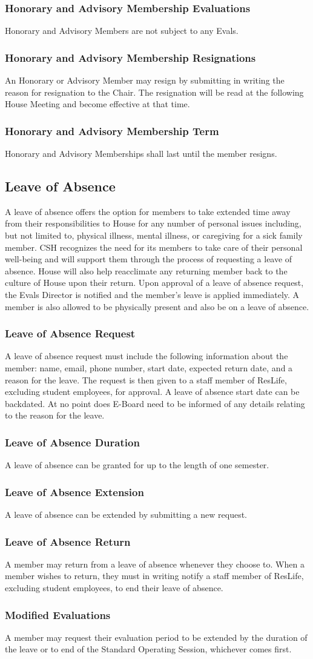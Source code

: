 \documentclass{article}
\newcommand{\asection}[1]{\subsection{#1} \label{#1}}
\newcommand{\asubsection}[1]{\subsubsection{#1} \label{#1}}
\begin{document}
\asubsection{Honorary and Advisory Membership Evaluations}
Honorary and Advisory Members are not subject to any Evals.

\asubsection{Honorary and Advisory Membership Resignations}
An Honorary or Advisory Member may resign by submitting in writing the reason for resignation to the Chair.
The resignation will be read at the following House Meeting and become effective at that time.

\asubsection{Honorary and Advisory Membership Term}
Honorary and Advisory Memberships shall last until the member resigns.

\asection{Leave of Absence}
A leave of absence offers the option for members to take extended time away from their responsibilities to House for any number of personal issues including, but not limited to, physical illness, mental illness, or caregiving for a sick family member.
CSH recognizes the need for its members to take care of their personal well-being and will support them through the process of requesting a leave of absence.
House will also help reacclimate any returning member back to the culture of House upon their return.
Upon approval of a leave of absence request, the Evals Director is notified and the member's leave is applied immediately.
A member is also allowed to be physically present and also be on a leave of absence.

\asubsection{Leave of Absence Request}
A leave of absence request must include the following information about the member: name, email, phone number, start date, expected return date, and a reason for the leave.
The request is then given to a staff member of ResLife, excluding student employees, for approval.
A leave of absence start date can be backdated.
At no point does E-Board need to be informed of any details relating to the reason for the leave.

\asubsection{Leave of Absence Duration}
A leave of absence can be granted for up to the length of one semester.

\asubsection{Leave of Absence Extension}
A leave of absence can be extended by submitting a new request.

\asubsection{Leave of Absence Return}
A member may return from a leave of absence whenever they choose to.
When a member wishes to return, they must in writing notify a staff member of ResLife, excluding student employees, to end their leave of absence.

\asubsection{Modified Evaluations}
A member may request their evaluation period to be extended by the duration of the leave or to end of the Standard Operating Session, whichever comes first.
\end{document}
